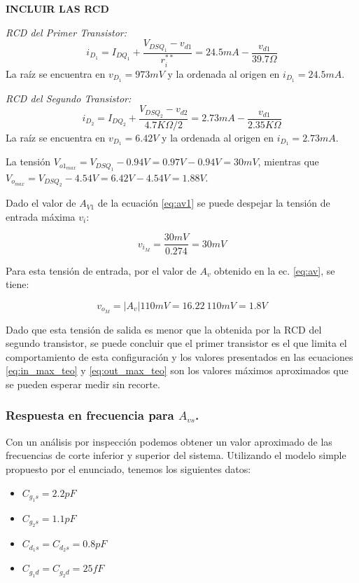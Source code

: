 \documentclass[a4paper, 10pt, spanish]{article}
\begin{document}
\textbf{INCLUIR LAS RCD}

\textit{RCD del Primer Transistor:}
\begin{equation}
  i_{D_1} = I_{DQ_1} + \frac{V_{DSQ_1} - v_{d1}}{r_i^{**}} = 24.5mA - \frac{v_{d1}}{39.7\Omega}
\end{equation}
La raíz se encuentra en $v_{D_1} = 973mV$ y la ordenada al origen en $i_{D_1} = 24.5mA$.

\textit{RCD del Segundo Transistor:}
\begin{equation}
  i_{D_2} = I_{DQ_2} + \frac{V_{DSQ_2} - v_{d2}}{4.7K\Omega/2} = 2.73mA - \frac{v_{d1}}{2.35K\Omega}
\end{equation}
La raíz se encuentra en $v_{D_1} = 6.42V$ y la ordenada al origen en $i_{D_1} = 2.73mA$.

La tensión $V_{o1_{max}}= V_{DSQ_1} - 0.94V = 0.97V - 0.94V = 30mV$, mientras que $V_{o_{max}}= V_{DSQ_2} - 4.54V = 6.42V - 4.54V = 1.88V$.

Dado el valor de $A_{V1}$ de la ecuación \ref{eq:av1} se puede despejar la tensión de entrada máxima $v_i$:

\begin{equation}
  v_{i_M}=\frac{30mV}{0.274}=30mV
  \label{eq:in_max_teo}
\end{equation}

Para esta tensión de entrada, por el valor de $A_v$ obtenido en la ec. \ref{eq:av}, se tiene:

\begin{equation}
  v_{o_M}=|A_v|110mV=16.22\ 110mV = 1.8V
  \label{eq:out_max_teo}
\end{equation}

Dado que esta tensión de salida es menor que la obtenida por la RCD del segundo transistor, se puede concluir que el primer transistor es el que limita el comportamiento de esta configuración y los valores presentados en las ecuaciones \ref{eq:in_max_teo} y \ref{eq:out_max_teo} son los valores máximos aproximados que se pueden esperar medir sin recorte.


\subsubsection{Respuesta en frecuencia para $A_{vs}$.}
Con un análisis por inspección podemos obtener un valor aproximado de las frecuencias de corte inferior y superior del sistema. Utilizando el modelo simple propuesto por el enunciado, tenemos los siguientes datos:
\begin{itemize}
  \item $C_{g_1s} = 2.2pF$
  \item $C_{g_2s} = 1.1pF$
  \item $C_{d_1s} = C_{d_2s} = 0.8pF$
  \item $C_{g_1d} = C_{g_2d} = 25fF$
\end{itemize}
\end{document}
